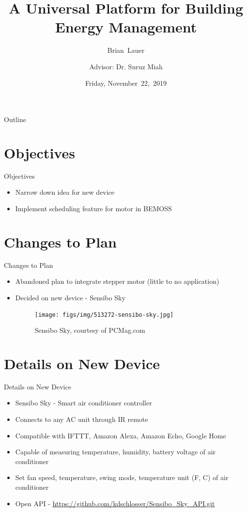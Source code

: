 \documentclass{beamer}
\title[Proposal Pres]{A Universal Platform for Building Energy Management}
\author[B.~Lauer]{Brian~Lauer\\\and
Advisor: Dr. Suruz Miah}
\institute[Bradley University] %
{
  Department of Electrical and Computer Engineering\\
  Bradley University\\
  1501 W. Bradley Avenue\\
  Peoria, IL, 61625, USA
}
\date[November~22,~2019]{Friday, November~22,~2019}
\begin{document}
\begin{frame}
  \titlepage
\end{frame}

\begin{frame}{Outline}
  \tableofcontents
\end{frame}

\section{Objectives}
\begin{frame}{Objectives}
\begin{itemize}
\item Narrow down idea for new device
\item Implement scheduling feature for motor in BEMOSS
\end{itemize}
\end{frame}

\section{Changes to Plan}
\begin{frame}{Changes to Plan}
\begin{itemize}
\item Abandoned plan to integrate stepper motor (little to no application)
\item Decided on new device - Sensibo Sky
\begin{figure}
\texttt{[image: figs/img/513272-sensibo-sky.jpg]}
\caption{Sensibo Sky, courtesy of PCMag.com}
\end{figure}
\end{itemize}
\end{frame}

\section{Details on New Device}
\begin{frame}{Details on New Device}
\begin{itemize}
\item Sensibo Sky - Smart air conditioner controller
\item Connects to any AC unit through IR remote
\item Compatible with IFTTT, Amazon Alexa, Amazon Echo, Google Home
\item Capable of measuring temperature, humidity, battery voltage of air conditioner
\item Set fan speed, temperature, swing mode, temperature unit (F, C) of air conditioner
\item Open API - \url{https://github.com/kdschlosser/Sensibo_Sky_API.git}
\end{itemize}
\end{frame}
\end{document}
